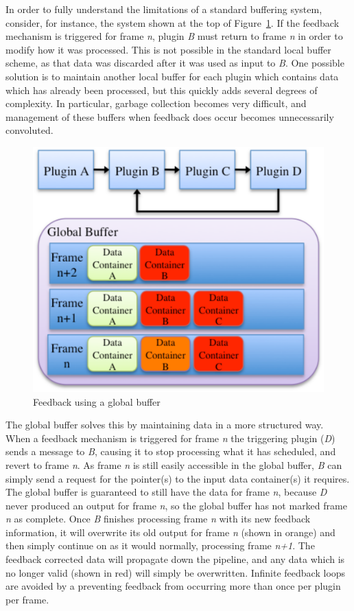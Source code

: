 In order to fully understand the limitations of a standard buffering system, consider, for instance, the system shown at the top of Figure~\ref{fig:Feedback}.  If the feedback mechanism is triggered for frame \emph{n}, plugin \emph{B} must return to frame \emph{n} in order to modify how it was processed. This is not possible in the standard local buffer scheme, as that data was discarded after it was used as input to \emph{B}. One possible solution is to maintain another local buffer for each plugin which contains data which has already been processed, but this quickly adds several degrees of complexity. In particular, garbage collection becomes very difficult, and management of these buffers when feedback does occur becomes unnecessarily convoluted.

\begin{figure}[t]
\begin{center}
\includegraphics[width=0.6\linewidth]{Feedback.pdf}
\end{center}
   \caption[Feedback using a Global Buffer]{Feedback using a global buffer}
\label{fig:Feedback}
\end{figure}

The global buffer solves this by maintaining data in a more structured way. When a feedback mechanism is triggered for frame \emph{n} the triggering plugin (\emph{D}) sends a message to \emph{B}, causing it to stop processing what it has scheduled, and revert to frame \emph{n}. As frame \emph{n} is still easily accessible in the global buffer, \emph{B} can simply send a request for the pointer(s) to the input data container(s) it requires. The global buffer is guaranteed to still have the data for frame \emph{n}, because \emph{D} never produced an output for frame \emph{n}, so the global buffer has not marked frame \emph{n} as complete. Once \emph{B} finishes processing frame \emph{n} with its new feedback information, it will overwrite its old output for frame \emph{n} (shown in orange) and then simply continue on as it would normally, processing frame \emph{n+1}. The feedback corrected data will propagate down the pipeline, and any data which is no longer valid (shown in red) will simply be overwritten. 
Infinite feedback loops are avoided by a preventing feedback from occurring more than once per plugin per frame.

